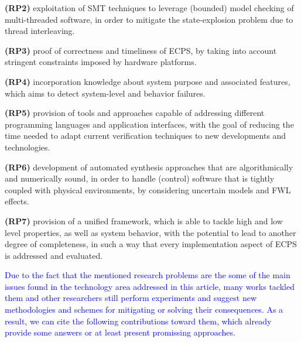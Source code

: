 \documentclass{cta-author}
\begin{document}
\textbf{(RP2)} exploitation of SMT techniques to leverage (bounded) model checking of multi-threaded software, in order to mitigate the state-explosion problem due to thread interleaving.

\textbf{(RP3)} proof of correctness and timeliness of ECPS, by taking into account stringent constraints imposed by hardware platforms.

\textbf{(RP4)} incorporation knowledge about system purpose and associated features, which aims to detect system-level and behavior failures.

\textbf{(RP5)} provision of tools and approaches capable of addressing different programming languages and application interfaces, with the goal of reducing the time needed to adapt current verification techniques to new developments and technologies.

\textbf{(RP6)} development of automated synthesis approaches that are algorithmically and numerically sound, in order to handle (control) software that is tightly coupled with physical environments, by considering uncertain models and FWL effects.

\textbf{(RP7)} provision of a unified framework, which is able to tackle high and low level properties, as well as system behavior, with the potential to lead to another degree of completeness, in such a way that every implementation aspect of ECPS is addressed and evaluated.

\textcolor{blue}{Due to the fact that the mentioned research problems are the some of the main issues found in the technology area addressed in this article, many works tackled them and other researchers still perform experiments and suggest new methodologies and schemes for mitigating or solving their consequences. As a result, we can cite the following contributions toward them, which already provide some answers or at least present promissing approaches.}
\end{document}
